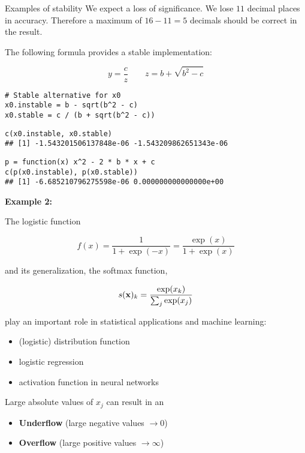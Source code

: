 \documentclass[11pt,compress,t,notes=noshow, xcolor=table]{beamer}
\begin{document}
\begin{vbframe}{Examples of stability}
\vspace{0.2cm}
\normalsize
We expect a loss of significance. 
We lose $11$ decimal places in accuracy. 
Therefore a maximum of $16 - 11 = 5$ decimals should be correct in the result.

\framebreak

The following formula provides a stable implementation:

$$
y = \frac{c}{z} \qquad z = b + \sqrt{b^2 - c}
$$
\lz
\footnotesize
\begin{verbatim}
# Stable alternative for x0
x0.instable = b - sqrt(b^2 - c)
x0.stable = c / (b + sqrt(b^2 - c))
\end{verbatim}

\vspace{0.1cm}
\begin{verbatim}
c(x0.instable, x0.stable)
## [1] -1.543201506137848e-06 -1.543209862651343e-06
\end{verbatim}

\vspace{0.1cm}
\begin{verbatim}
p = function(x) x^2 - 2 * b * x + c
c(p(x0.instable), p(x0.stable))
## [1] -6.685210796275598e-06 0.000000000000000e+00
\end{verbatim}

\normalsize

\framebreak

\textbf{Example 2:}

The logistic function

$$
f(x) = \frac{1}{1 + \exp(-x)} = \frac{\exp(x)}{1 + \exp(x)}
$$

and its generalization, the softmax function,

$$
s(\mathbf{x})_k = \frac{\exp(x_k)}{\sum_j \exp(x_j)}
$$


play an important role in statistical applications and machine learning:

\begin{itemize}
\item (logistic) distribution function
\item logistic regression
\item activation function in neural networks
\end{itemize}

\framebreak

Large absolute values of $x_j$ can result in an

\begin{itemize}
\item \textbf{Underflow} (large negative values $\to 0$)
\item \textbf{Overflow} (large positive values $\to \infty$)
\end{itemize}
\lz
\footnotesize


\end{vbframe}
\end{document}
